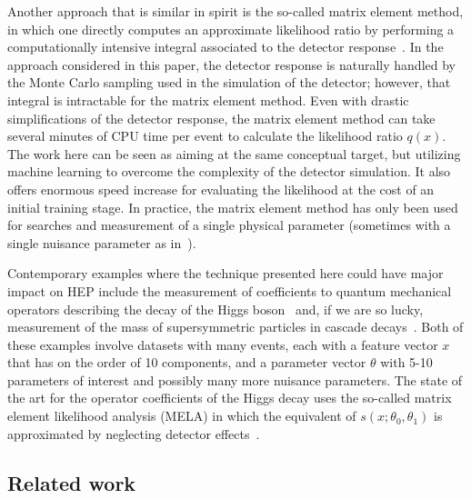 \documentclass{article} %
\begin{document}
Another approach that is similar in spirit is the so-called matrix element method, in which one  directly computes an approximate likelihood ratio by performing a computationally intensive integral associated to the detector response~\cite{Volobouev:2011vb}. In the approach considered in this paper, the detector response is naturally handled by the Monte Carlo sampling used in the simulation of the detector; however, that integral is intractable for the matrix element method. Even with drastic simplifications of the detector response, the matrix element method can take several minutes of CPU time per event to calculate the likelihood ratio $q(x)$. The work here can be seen as aiming at the same conceptual target, but utilizing machine learning to overcome the complexity of the detector simulation. It also offers enormous speed increase for evaluating the likelihood at the cost of an initial training stage. In practice, the matrix element method has only been used for searches and measurement of a single physical parameter (sometimes with a single nuisance parameter as in~\cite{Aaltonen:2010yz}).

Contemporary examples where the technique presented here could have major impact on HEP include the measurement of coefficients to quantum mechanical operators describing the decay of the Higgs boson~\cite{Chen:2014pia} and, if we are so lucky, measurement of the mass of supersymmetric particles in cascade decays~\cite{Allanach:2000kt}.  Both of these examples involve datasets with many events, each with a feature vector $x$ that has on the order of 10 components, and a parameter vector $\theta$ with 5-10 parameters of interest and possibly many more nuisance parameters. 
The state of the art for the operator coefficients of the Higgs decay uses the so-called matrix element likelihood analysis (MELA) in which the equivalent of $s(x; \theta_0, \theta_1)$ is approximated by neglecting detector effects~\cite{Bolognesi:2012mm}. 

\subsection{Related work}

\end{document}
